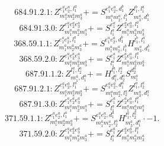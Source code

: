\documentclass[letterpaper,10pt,fleqn,leqno,onecolumn]{article}
\begin{document}
\begin{equation} \;\;\;\;\;\;  684.91.2.1: Z^{e_{1}^{a}e_{2}^{a},l_{1}^{a}}_{m_{1}^{a}m_{2}^{a}m_{3}^{a}}+=S^{e_{1}^{a}e_{2}^{a},d_{1}^{b}}_{m_{1}^{a}m_{2}^{a},l_{1}^{b}}Z^{l_{1}^{b},l_{1}^{a}}_{m_{3}^{a},d_{1}^{b}} \end{equation}
\begin{equation} \;\;\;\;\;\;  684.91.3.0: Z^{e_{1}^{a}e_{2}^{a}e_{3}^{a}}_{m_{1}^{a}m_{2}^{a}m_{3}^{a}}+=S^{e_{1}^{a}}_{l_{1}^{a}}Z^{e_{2}^{a}e_{3}^{a},l_{1}^{a}}_{m_{1}^{a}m_{2}^{a}m_{3}^{a}} \end{equation}
\begin{equation} \;\;\;\;\;\;  368.59.1.1: Z^{e_{1}^{a}e_{2}^{a},l_{1}^{a}}_{m_{1}^{a}m_{2}^{a}m_{3}^{a}}+=S^{e_{1}^{a}e_{2}^{a},d_{1}^{b}}_{m_{1}^{a}m_{2}^{a},l_{1}^{b}}H^{l_{1}^{b},l_{1}^{a}}_{m_{3}^{a},d_{1}^{b}} \end{equation}
\begin{equation} \;\;\;\;\;\;  368.59.2.0: Z^{e_{1}^{a}e_{2}^{a}e_{3}^{a}}_{m_{1}^{a}m_{2}^{a}m_{3}^{a}}+=S^{e_{1}^{a}}_{l_{1}^{a}}Z^{e_{2}^{a}e_{3}^{a},l_{1}^{a}}_{m_{1}^{a}m_{2}^{a}m_{3}^{a}} \end{equation}
\begin{equation} \;\;\;\;\;\;  687.91.1.2: Z^{l_{1}^{a},l_{2}^{a}}_{m_{1}^{a},d_{1}^{a}}+=H^{l_{1}^{a},l_{2}^{a}}_{d_{1}^{a},d_{2}^{a}}S^{d_{2}^{a}}_{m_{1}^{a}} \end{equation}
\begin{equation} \;\;\;\;\;\;  687.91.2.1: Z^{e_{1}^{a}e_{2}^{a},l_{1}^{a}}_{m_{1}^{a}m_{2}^{a}m_{3}^{a}}+=S^{e_{1}^{a}e_{2}^{a},d_{1}^{a}}_{m_{1}^{a}m_{2}^{a},l_{2}^{a}}Z^{l_{1}^{a},l_{2}^{a}}_{m_{3}^{a},d_{1}^{a}} \end{equation}
\begin{equation} \;\;\;\;\;\;  687.91.3.0: Z^{e_{1}^{a}e_{2}^{a}e_{3}^{a}}_{m_{1}^{a}m_{2}^{a}m_{3}^{a}}+=S^{e_{1}^{a}}_{l_{1}^{a}}Z^{e_{2}^{a}e_{3}^{a},l_{1}^{a}}_{m_{1}^{a}m_{2}^{a}m_{3}^{a}} \end{equation}
\begin{equation} \;\;\;\;\;\;  371.59.1.1: Z^{e_{1}^{a}e_{2}^{a},l_{1}^{a}}_{m_{1}^{a}m_{2}^{a}m_{3}^{a}}+=S^{e_{1}^{a}e_{2}^{a},d_{1}^{a}}_{m_{1}^{a}m_{2}^{a},l_{2}^{a}}H^{l_{1}^{a},l_{2}^{a}}_{m_{3}^{a},d_{1}^{a}}\cdot -1. \end{equation}
\begin{equation} \;\;\;\;\;\;  371.59.2.0: Z^{e_{1}^{a}e_{2}^{a}e_{3}^{a}}_{m_{1}^{a}m_{2}^{a}m_{3}^{a}}+=S^{e_{1}^{a}}_{l_{1}^{a}}Z^{e_{2}^{a}e_{3}^{a},l_{1}^{a}}_{m_{1}^{a}m_{2}^{a}m_{3}^{a}} \end{equation}
\end{document}
